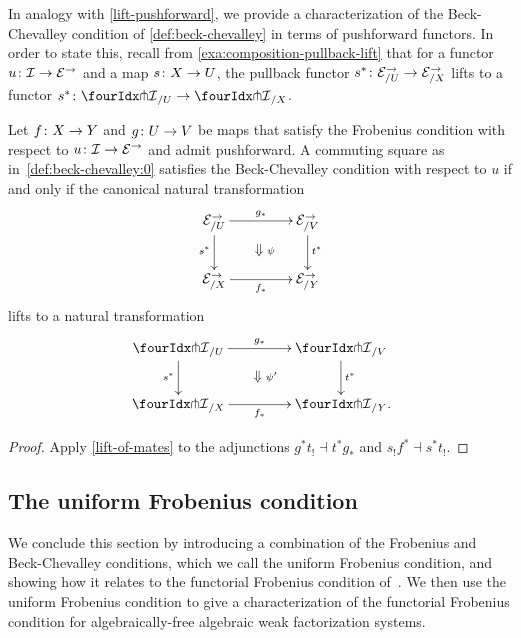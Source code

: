 \documentclass[reqno,10pt,a4paper,oneside,draft]{amsart}
\begin{document}
In analogy with \cref{lift-pushforward}, we provide a characterization of the Beck-Chevalley condition of \cref{def:beck-chevalley} in terms of pushforward functors.
In order to state this, recall from \cref{exa:composition-pullback-lift} that for a functor $u \colon \mathcal{I} \to \mathcal{E}^\to$ and a map $s \colon X \to U$, the pullback functor $s^* \colon \mathcal{E}^\to_{/U} \to \mathcal{E}^\to_{/X}$ lifts to a functor $s^* \co {\liftr{\cal{I}}}_{/U} \to {\liftr{\cal{I}}}_{/X}$.

\begin{proposition} \label{lift-pushforward-BC}
Let $f \colon X \to Y$ and $g \colon U \to V$ be maps that satisfy the Frobenius condition with respect to $u \colon \mathcal{I} \to \mathcal{E}^\to$ and admit pushforward.
A commuting square as in~\eqref{def:beck-chevalley:0} satisfies the Beck-Chevalley condition with respect to $u$ if and only if the canonical natural transformation
\[
\xymatrix@C+2em{
  \catE^\to_{/U}
  \ar[r]^{g_*}
  \ar[d]_{s^*}
  \ar@{}[dr]|{\textstyle\Downarrow \rlap{$\labelstyle\psi$}}
&
  \catE^\to_{/V}
  \ar[d]^{t^*}
\\
  \catE^\to_{/X}
  \ar[r]_{f_*}
&
  \catE^\to_{/Y}
}
\]
lifts to a natural transformation
\[
\xymatrix@C+2em{
  {\liftr{\cal{I}}}_{/U}
  \ar[r]^{g_*}
  \ar[d]_{s^*}
  \ar@{}[dr]|{\textstyle\Downarrow \rlap{$\labelstyle\psi'$}}
&
  {\liftr{\cal{I}}}_{/V}
  \ar[d]^{t^*}
\\
  {\liftr{\cal{I}}}_{/X}
  \ar[r]_{f_*}
&
  {\liftr{\cal{I}}}_{/Y}
\rlap{.}}
\]
\end{proposition}

\begin{proof}
Apply \cref{lift-of-mates} to the adjunctions $g^* t_! \dashv t^* g_*$ and $s_! f^* \dashv s^* t_!$.
\end{proof}


\subsection*{The uniform Frobenius condition} 
We conclude this section by introducing a combination of the Frobenius and Beck-Chevalley conditions,
which we call the uniform Frobenius condition, and showing how it relates to the functorial Frobenius
condition of~\cite{garner:topological-simplicial}. We then use the uniform Frobenius condition to give
a characterization of the functorial Frobenius condition for algebraically-free algebraic weak factorization systems.
\end{document}
